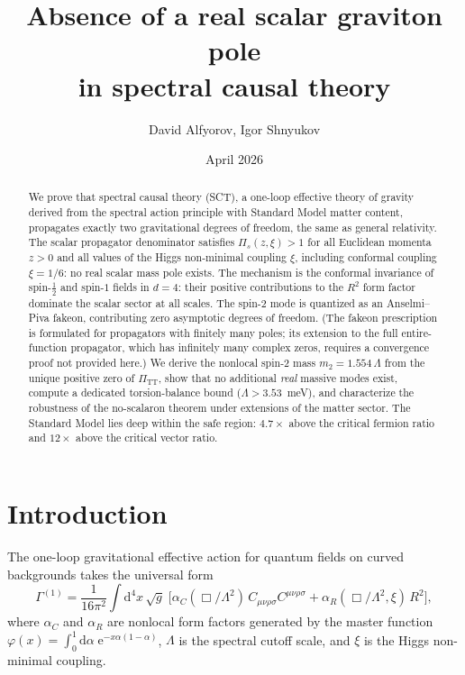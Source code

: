 \documentclass[12pt,a4paper]{article}
\title{\textbf{Absence of a real scalar graviton pole\\
in spectral causal theory}}
\author{David Alfyorov, Igor Shnyukov}
\date{April 2026}
\newcommand{\Lam}{\Lambda}
\newcommand{\PiTT}{\Pi_{\mathrm{TT}}}
\newcommand{\Pis}{\Pi_{s}}
\newcommand{\alphaR}{\alpha_R}
\newcommand{\alphaC}{\alpha_C}
\newcommand{\half}{\tfrac{1}{2}}
\newcommand{\dd}{\mathrm{d}}
\newcommand{\ee}{\mathrm{e}}
\begin{document}
\maketitle

\begin{abstract}
We prove that spectral causal theory (SCT), a one-loop effective theory of
gravity derived from the spectral action principle with Standard Model matter
content, propagates exactly two gravitational degrees of freedom, the same as
general relativity. The scalar propagator denominator satisfies $\Pis(z,\xi) > 1$
for all Euclidean momenta $z > 0$ and all values of the Higgs
non-minimal coupling $\xi$, including conformal coupling $\xi = 1/6$:
no real scalar mass pole exists.
The mechanism is the conformal invariance of spin-$\half$ and spin-$1$ fields
in $d = 4$: their positive contributions to the $R^2$ form factor dominate
the scalar sector at all scales.
The spin-2 mode is quantized as an Anselmi--Piva fakeon, contributing zero
asymptotic degrees of freedom.  (The fakeon prescription is formulated for
propagators with finitely many poles; its extension to the full
entire-function propagator, which has infinitely many complex zeros,
requires a convergence proof not provided here.)
We derive the nonlocal spin-2 mass $m_2 = 1.554\,\Lam$ from the unique
positive zero of $\PiTT$, show that no additional \emph{real} massive modes
exist, compute a dedicated torsion-balance bound ($\Lam > 3.53$~meV),
and characterize the robustness of the no-scalaron theorem under
extensions of the matter sector.
The Standard Model lies deep within the safe region: $4.7\times$ above the
critical fermion ratio and $12\times$ above the critical vector ratio.
\end{abstract}

\tableofcontents

\section{Introduction}
\label{sec:intro}

The one-loop gravitational effective action for quantum fields on curved
backgrounds takes the universal form~\cite{BV1985,CZ2012}
\begin{equation}\label{eq:action}
  \Gamma^{(1)} = \frac{1}{16\pi^2}
  \int \dd^4x\,\sqrt{g}\;\bigl[
    \alphaC(\Box/\Lam^2)\,C_{\mu\nu\rho\sigma}C^{\mu\nu\rho\sigma}
    + \alphaR(\Box/\Lam^2,\xi)\,R^2
  \bigr],
\end{equation}
where $\alphaC$ and $\alphaR$ are nonlocal form factors generated by
the master function $\varphi(x) = \int_0^1 \dd\alpha\;\ee^{-x\alpha(1-\alpha)}$,
$\Lam$ is the spectral cutoff scale, and $\xi$ is the Higgs non-minimal
coupling.
\end{document}
